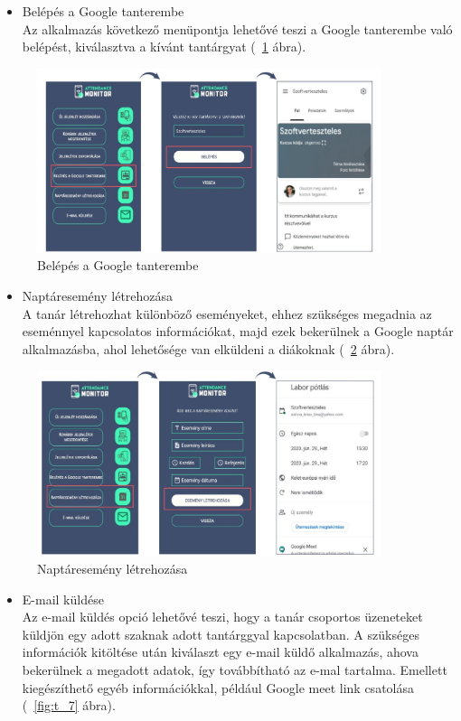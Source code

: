\documentclass[12pt]{article}
\numberwithin{figure}{section}
\numberwithin{equation}{section}
\begin{document}
\begin{itemize}
	\item {Belépés a Google tanterembe}\\
	Az alkalmazás következő menüpontja lehetővé teszi a Google tanterembe való belépést, kiválasztva a kívánt tantárgyat (~\ref{fig:t_5} ábra). 
\end{itemize}


\begin{figure}[H]
	\centering
	\includegraphics[width=380px]{t_5.jpg}
	\caption{Belépés a Google tanterembe}
	\label{fig:t_5}
\end{figure}


\begin{itemize}
	\item {Naptáresemény létrehozása}\\
	A tanár létrehozhat különböző eseményeket, ehhez szükséges megadnia az eseménnyel kapcsolatos információkat, majd ezek bekerülnek a Google naptár alkalmazásba, ahol lehetősége van elküldeni a diákoknak (~\ref{fig:t_6} ábra). 
\end{itemize}


\begin{figure}[H]
	\centering
	\includegraphics[width=380px]{t_6.jpg}
	\caption{Naptáresemény létrehozása}
	\label{fig:t_6}
\end{figure}

\begin{itemize}
	\item {E-mail küldése}\\
	Az e-mail küldés opció lehetővé teszi, hogy a tanár csoportos üzeneteket küldjön egy adott szaknak adott tantárggyal kapcsolatban. A szükséges információk kitöltése után kiválaszt egy e-mail küldő alkalmazás, ahova bekerülnek a megadott adatok, így továbbítható az e-mal tartalma. Emellett kiegészíthető egyéb információkkal, például Google meet link csatolása (~\ref{fig:t_7} ábra). 
\end{itemize}
\end{document}
